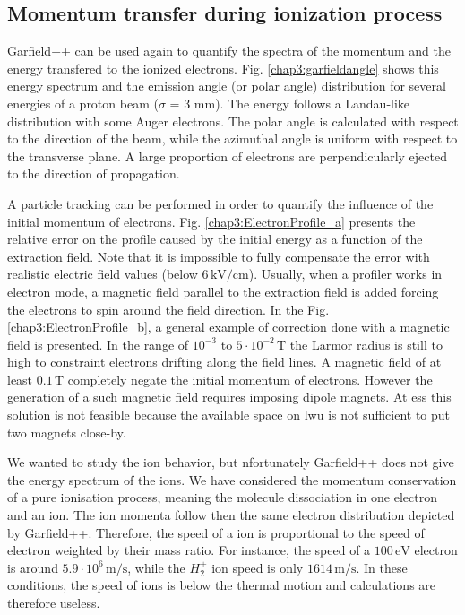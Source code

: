 \begin{refsection}
  \subsection{Momentum transfer during ionization process}
  Garfield++ can be used again to quantify the spectra of the momentum and the energy transfered to the ionized electrons. Fig. \ref{chap3:garfieldangle} shows this energy spectrum and the emission angle (or polar angle) distribution for several energies of a proton beam ($\sigma$ = 3 mm). The energy follows a Landau-like distribution with some Auger electrons. The polar angle is calculated with respect to the direction of the beam, while the azimuthal angle is uniform with respect to the transverse plane. A large proportion of electrons are perpendicularly ejected to the direction of propagation.

  

  A particle tracking can be performed in order to quantify the influence of the initial momentum of electrons. Fig. \ref{chap3:ElectronProfile_a} presents the relative error on the profile caused by the initial energy as a function of the extraction field. Note that it is impossible to fully compensate the error with realistic electric field values (below $6\,\mathrm{kV/cm}$). Usually, when a profiler works in electron mode, a magnetic field parallel to the extraction field is added forcing the electrons to spin around the field direction. In the Fig. \ref{chap3:ElectronProfile_b}, a general example of correction done with a magnetic field is presented. In the range of $10^{-3}$ to $5\cdot10^{-2}\,\mathrm{T}$ the Larmor radius is still to high to constraint electrons drifting along the field lines.
  A magnetic field of at least $0.1\,\mathrm{T}$ completely negate the initial momentum of electrons. However the generation of a such magnetic field requires imposing dipole magnets. At \acrshort{ess} this solution is not feasible because the available space on \acrshort{lwu} is not sufficient to put two magnets close-by.

  

  We wanted to study the ion behavior, but nfortunately Garfield++ does not give the energy spectrum of the ions.
  We have considered the momentum conservation of a pure ionisation process, meaning the molecule dissociation in one electron and an ion. The ion momenta follow then the same electron distribution depicted by Garfield++. Therefore, the speed of a ion is proportional to the speed of electron weighted by their mass ratio. For instance, the speed of a $100\,\mathrm{eV}$ electron is around $5.9\cdot10^{6}\,\mathrm{m/s}$, while the $H_{2}^{+}$ ion speed is only $1614\,\mathrm{m/s}$. In these conditions, the speed of ions is below the thermal motion and calculations are therefore useless.



\end{refsection}
